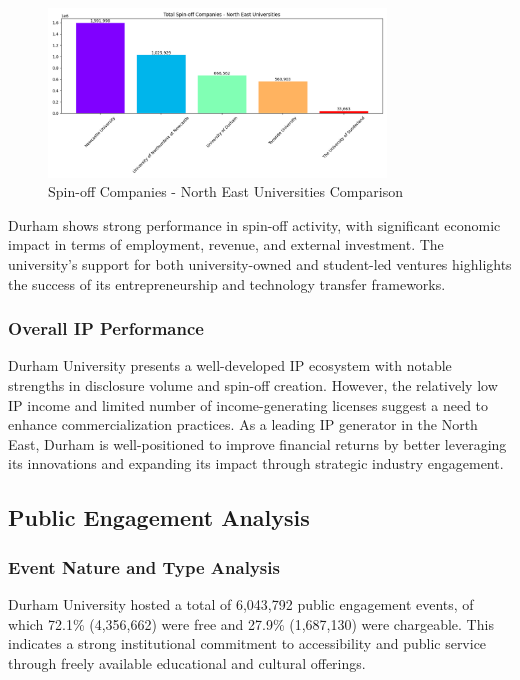 \documentclass[journal,onecolumn, 10pt,draftclsnofoot]{IEEEtran}
\begin{document}
\begin{figure}[h]
\centering
\includegraphics[width=0.8\textwidth]{Fig/figure29.spin_ne_comparison.png}
\caption{Spin-off Companies - North East Universities Comparison}
\label{fig:spin-ne-comparison}
\end{figure}

Durham shows strong performance in spin-off activity, with significant economic impact in terms of employment, revenue, and external investment. The university's support for both university-owned and student-led ventures highlights the success of its entrepreneurship and technology transfer frameworks.

\subsubsection{Overall IP Performance}

Durham University presents a well-developed IP ecosystem with notable strengths in disclosure volume and spin-off creation. However, the relatively low IP income and limited number of income-generating licenses suggest a need to enhance commercialization practices. As a leading IP generator in the North East, Durham is well-positioned to improve financial returns by better leveraging its innovations and expanding its impact through strategic industry engagement.

\subsection{Public Engagement Analysis}

\subsubsection{Event Nature and Type Analysis}

Durham University hosted a total of 6,043,792 public engagement events, of which 72.1\% (4,356,662) were free and 27.9\% (1,687,130) were chargeable. This indicates a strong institutional commitment to accessibility and public service through freely available educational and cultural offerings.
\end{document}
